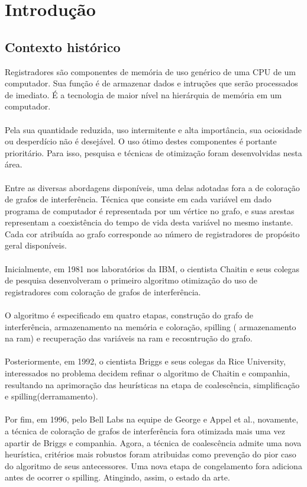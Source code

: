 \section{Introdução}
\subsection{Contexto histórico}
Registradores são componentes de memória de uso genérico de uma CPU de um computador. Sua função é de armazenar dados e intruções que serão processados de imediato. É a tecnologia de maior nível na hierárquia de memória em um computador.
\\
\\
Pela sua quantidade reduzida, uso intermitente e alta importância, sua ociosidade ou desperdício não é desejável. O uso ótimo destes componentes é portante prioritário. Para isso, pesquisa e técnicas de otimização foram desenvolvidas nesta área.
\\
\\
Entre as diversas abordagens disponíveis, uma delas adotadas fora a de coloração de grafos de interferência. Técnica que consiste em cada variável em dado programa de computador é representada por um vértice no grafo, e suas arestas representam a coexistência do tempo de vida desta variável no mesmo instante. Cada cor atribuída ao grafo corresponde ao número de registradores de propósito geral disponíveis.
\\
\\
Inicialmente, em 1981 nos laboratórios da IBM, o cientista Chaitin e seus colegas de pesquisa desenvolveram o primeiro algoritmo otimização do uso de registradores com coloração de grafos de interferência.
\\
\\
O algoritmo é especificado em quatro etapas, construção do grafo de interferência, armazenamento na memória e coloração, spilling ( armazenamento na ram) e recuperação das variáveis na ram e recosntrução do grafo.
\\
\\
Posteriormente, em 1992, o cientista Briggs e seus colegas da Rice University, interessados no problema decidem refinar o algoritmo de Chaitin e companhia, resultando na aprimoração das heurísticas na etapa de coalescência, simplificação e spilling(derramamento).
\\
\\
Por fim, em 1996, pelo Bell Labs na equipe de George e Appel et al., novamente, a técnica de coloração de grafos de interferência fora otimizada mais uma vez apartir de Briggs e companhia. Agora, a técnica de coalescência admite uma nova heurística, critérios mais robustos foram atribuidas como prevenção do pior caso do algoritmo de seus antecessores. Uma nova etapa de congelamento fora adiciona antes de ocorrer o spilling. Atingindo, assim, o estado da arte.